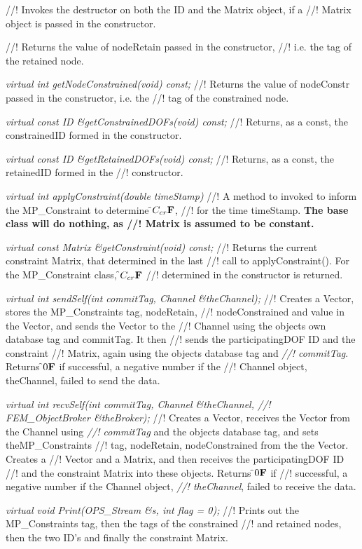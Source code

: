 //! Invokes the destructor on both the ID and the Matrix object, if a
//! Matrix object is passed in the constructor.

//! Returns the value of \p nodeRetain passed in the constructor,
//! i.e. the tag of the retained node.

{\em virtual int getNodeConstrained(void) const;    }
//! Returns the value of \p nodeConstr passed in the constructor, i.e. the
//! tag of the constrained node.

{\em virtual const ID \&getConstrainedDOFs(void) const;   }     
//! Returns, as a const, the \p constrainedID formed in the constructor.

{\em virtual const ID \&getRetainedDOFs(void) const;   }     
//! Returns, as a const, the \p retainedID formed in the
//! constructor.

{\em virtual int applyConstraint(double timeStamp)}     
//! A method to invoked to inform the MP\_Constraint to determine \f$C_{cr}{\bf F}$,
//! for the time \p timeStamp. {\bf The base class will do nothing, as
//! Matrix is assumed to be constant.}

{\em virtual const Matrix \&getConstraint(void) const;}
//! Returns the current constraint Matrix, that determined in the last
//! call to applyConstraint(). For the MP\_Constraint class, \f$C_{cr}{\bf F}$
//! determined in the constructor is returned.

{\em virtual int sendSelf(int commitTag, Channel \&theChannel);}
//! Creates a Vector, stores the MP\_Constraints tag, nodeRetain,
//! nodeConstrained and value in the Vector, and sends the Vector to the
//! Channel using the objects own database tag and \p commitTag. It then
//! sends the \p participatingDOF ID and the \p constraint
//! Matrix, again using the objects database tag and {\em
//! commitTag}. Returns \f$0{\bf F}$ if successful, a negative number if the
//! Channel object, \p theChannel, failed to send the data. 

{\em virtual int recvSelf(int commitTag, Channel \&theChannel,
//! FEM\_ObjectBroker \&theBroker);} 
//! Creates a Vector, receives the Vector from the Channel using {\em
//! commitTag} and the objects database tag, and sets theMP\_Constraints
//! tag, nodeRetain, nodeConstrained from the the Vector. Creates a
//! Vector and a Matrix, and then receives the \p participatingDOF ID
//! and the \p constraint Matrix into these objects. Returns \f$0{\bf F}$ if
//! successful, a negative number if the Channel object, {\em
//! theChannel}, failed to receive the data. 

{\em virtual void Print(OPS_Stream \&s, int flag = 0);}
//! Prints out the MP\_Constraints tag, then the tags of the constrained
//! and retained nodes, then the two ID's and finally the constraint Matrix.






